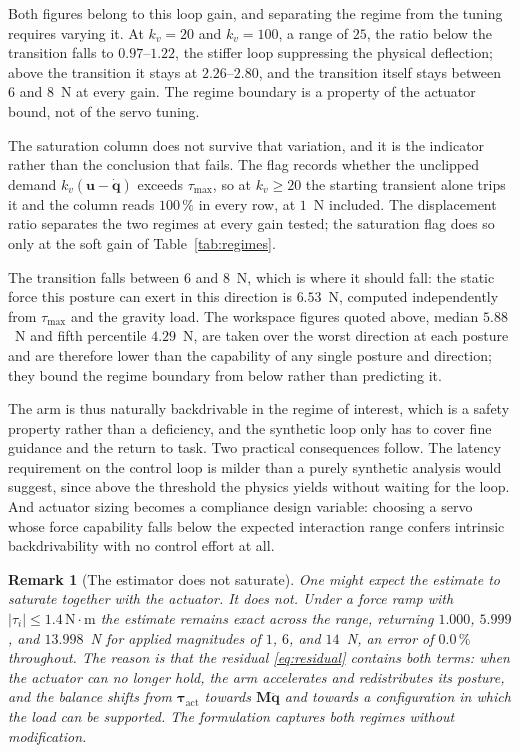 \documentclass{ieeeaccess}
\newtheorem{remark}{Remark}
\newcommand{\tauact}{\bm{\tau}_{\mathrm{act}}}
\begin{document}
Both figures belong to this loop gain, and separating the regime from the tuning
requires varying it. At $k_v=20$ and $k_v=100$, a range of $25$, the ratio below
the transition falls to $0.97$--$1.22$, the stiffer loop suppressing the physical
deflection; above the transition it stays at $2.26$--$2.80$, and the transition
itself stays between $6$ and $8$~N at every gain. The regime boundary is a
property of the actuator bound, not of the servo tuning.

The saturation column does not survive that variation, and it is the indicator
rather than the conclusion that fails. The flag records whether the unclipped
demand $k_v(\bm u-\dot{\bm q})$ exceeds $\tau_{\max}$, so at $k_v\ge20$ the
starting transient alone trips it and the column reads $100\,\%$ in every row, at
$1$~N included. The displacement ratio separates the two regimes at every gain
tested; the saturation flag does so only at the soft gain of
Table~\ref{tab:regimes}.

The transition falls
between $6$ and $8$~N, which is where it should fall: the static force this posture can
exert in this direction is $6.53$~N, computed independently from
$\tau_{\max}$ and the gravity load. The workspace figures quoted above, median
$5.88$~N and fifth percentile $4.29$~N, are taken over the worst direction at each
posture and are therefore lower than the capability of any single posture and
direction; they bound the regime boundary from below rather than predicting it.

The arm is thus naturally backdrivable in the regime of interest, which is a
safety property rather than a deficiency, and the synthetic loop only has to cover
fine guidance and the return to task. Two practical consequences follow. The
latency requirement on the control loop is milder than a purely synthetic analysis
would suggest, since above the threshold the physics yields without waiting for
the loop. And actuator sizing becomes a compliance design variable: choosing a
servo whose force capability falls below the expected interaction range confers
intrinsic backdrivability with no control effort at all.

\begin{remark}[The estimator does not saturate]
One might expect the estimate to saturate together with the actuator. It does not.
Under a force ramp with $|\tau_i|\le1.4\,\mathrm{N}\cdot\mathrm{m}$ the estimate
remains exact across the range, returning $1.000$, $5.999$, and $13.998$~N for
applied magnitudes of $1$, $6$, and $14$~N, an error of $0.0\,\%$ throughout. The
reason is that the residual \eqref{eq:residual} contains both terms: when the
actuator can no longer hold, the arm accelerates and redistributes its posture,
and the balance shifts from $\tauact$ towards $\bm M\ddot{\bm q}$ and towards a
configuration in which the load can be supported. The formulation captures both
regimes without modification.
\end{remark}
\end{document}
